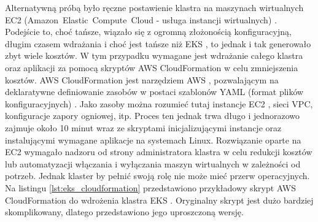 Alternatywną próbą było ręczne postawienie klastra na maszynach wirtualnych EC2 (\mbox{Amazon Elastic Compute Cloud} - usługa instancji wirtualnych) \cite{ec2_docs}. Podejście to, choć tańsze, wiązało się z ogromną złożonością konfiguracyjną, długim czasem wdrażania i choć jest tańsze niż EKS \cite{eks_docs}, to jednak i tak generowało zbyt wiele kosztów. W tym przypadku wymagane jest wdrażanie całego klastra oraz aplikacji za pomocą skryptów AWS CloudFormation \cite{cloudformation_docs} w celu zmniejszenia kosztów. AWS CloudFormation \cite{cloudformation_docs} jest narzędziem AWS \cite{aws_docs}, pozwalającym na deklaratywne definiowanie zasobów w postaci szablonów YAML (format plików konfiguracyjnych) \cite{yaml_spec}. Jako zasoby można rozumieć tutaj instancje EC2 \cite{ec2_docs}, sieci VPC, konfiguracje zapory ogniowej, itp. Proces ten jednak trwa długo i jednorazowo zajmuje około 10 minut wraz ze skryptami inicjalizującymi instancje oraz instalującymi wymagane aplikacje na systemach Linux. Rozwiązanie oparte na EC2 \cite{ec2_docs} wymagało nadzoru od strony administratora klastra w celu redukcji kosztów lub automatyzacji włączania i wyłączania maszyn wirtualnych w zależności od potrzeb. Jednak klaster by pełnić swoją rolę nie może mieć przerw operacyjnych. Na listingu \ref{lst:eks_cloudformation} przedstawiono przykładowy skrypt AWS CloudFormation \cite{cloudformation_docs} do wdrożenia klastra EKS \cite{eks_docs}. Oryginalny skrypt jest dużo bardziej skomplikowany, dlatego przedstawiono jego uproszczoną wersję.

